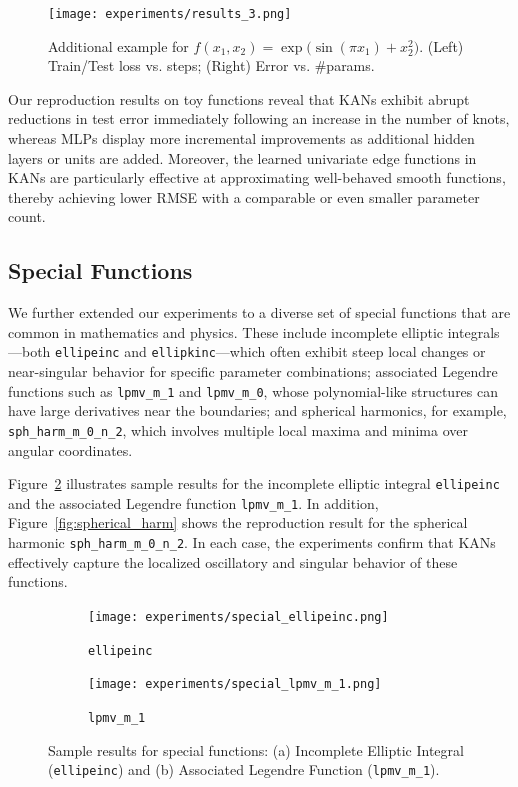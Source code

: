 \documentclass[conference]{IEEEtran}
\begin{document}
\begin{figure}[H]
    \centering
    \texttt{[image: experiments/results\_3.png]}
    \caption{Additional example for \(f(x_1,x_2)=\exp\bigl(\sin(\pi x_1)+x_2^2\bigr)\). (Left) Train/Test loss vs. steps; (Right) Error vs. \#params.}
    \label{fig:results3}
\end{figure}

Our reproduction results on toy functions reveal that KANs exhibit abrupt
reductions in test error immediately following an increase in the number of
knots, whereas MLPs display more incremental improvements as additional hidden
layers or units are added. Moreover, the learned univariate edge functions in
KANs are particularly effective at approximating well-behaved smooth functions,
thereby achieving lower RMSE with a comparable or even smaller parameter count.

\subsection{Special Functions}

We further extended our experiments to a diverse set of special functions that
are common in mathematics and physics. These include incomplete elliptic
integrals—both \texttt{ellipeinc} and \texttt{ellipkinc}—which often exhibit
steep local changes or near-singular behavior for specific parameter
combinations; associated Legendre functions such as \texttt{lpmv\_m\_1} and
\texttt{lpmv\_m\_0}, whose polynomial-like structures can have large
derivatives near the boundaries; and spherical harmonics, for example,
\texttt{sph\_harm\_m\_0\_n\_2}, which involves multiple local maxima and minima
over angular coordinates.

Figure~\ref{fig:special_functions} illustrates sample results for the
incomplete elliptic integral \texttt{ellipeinc} and the associated Legendre
function \texttt{lpmv\_m\_1}. In addition, Figure~\ref{fig:spherical_harm}
shows the reproduction result for the spherical harmonic
\texttt{sph\_harm\_m\_0\_n\_2}. In each case, the experiments confirm that KANs
effectively capture the localized oscillatory and singular behavior of these
functions.

\begin{figure}[H]
    \centering
    \begin{subfigure}[b]{0.45\linewidth}
        \centering
        \texttt{[image: experiments/special\_ellipeinc.png]}
        \caption{\texttt{ellipeinc}}
    \end{subfigure}
    \quad
    \begin{subfigure}[b]{0.45\linewidth}
        \centering
        \texttt{[image: experiments/special\_lpmv\_m\_1.png]}
        \caption{\texttt{lpmv\_m\_1}}
    \end{subfigure}
    \caption{Sample results for special functions: (a) Incomplete Elliptic Integral (\texttt{ellipeinc}) and (b) Associated Legendre Function (\texttt{lpmv\_m\_1}).}
    \label{fig:special_functions}
\end{figure}
\end{document}
